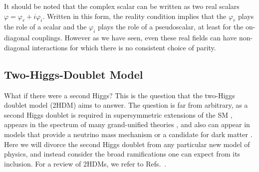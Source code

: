 It should be noted that the complex scalar can be written as two real scalars $\varphi = \varphi_r + i\varphi_i$. Written in this form, the reality condition implies that the $\varphi_r$ plays the role of a scalar and the $\varphi_i$ plays the role of a pseudoscalar, at least for the on-diagonal couplings. However as we have seen, even these real fields can have non-diagonal interactions for which there is no consistent choice of parity.


\subsection{Two-Higgs-Doublet Model}\label{sec:2HDM}
What if there were a second Higgs? This is the question that the two-Higgs doublet model (2HDM) aims to answer. The question is far from arbitrary, as a second Higgs doublet is required in supersymmetric extensions of the SM \cite{Haber:1984rc,Csaki:1996ks}, appears in the spectrum of many grand-unified theories {\color{red} \cite{}}, and also can appear in models that provide a neutrino mass mechanism \cite{Ma:2000cc,Gabriel:2006ns,Wang:2006jy} or a candidate for dark matter \cite{Ma:2006fn,Ma:2006km,Aoki:2008av}. Here we will divorce the second Higgs doublet from any particular new model of physics, and instead consider the broad ramifications one can expect from its inclusion. For a review of 2HDMs, we refer to Refs.~\cite{Aoki:2009ha,Branco:2011iw,Wang:2022yhm}.

